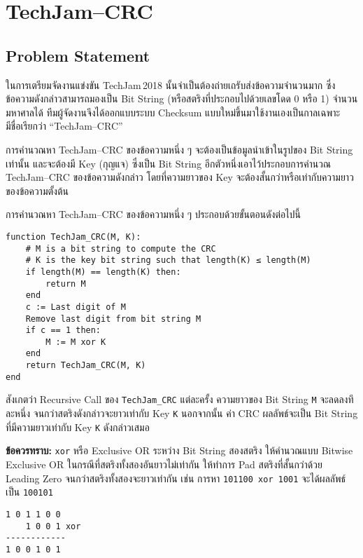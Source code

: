 \section{TechJam–CRC}

\subsection{Problem Statement}

ในการเตรียมจัดงานแข่งขัน TechJam{\,}2018 นั้นจำเป็นต้องถ่ายเถรับส่งข้อความจำนวนมาก ซึ่งข้อความดังกล่าวสามารถมองเป็น Bit String (หรือสตริงที่ประกอบไปด้วยเลขโดด 0 หรือ 1) จำนวนมหาศาลได้ \;
ทีมผู้จัดงานจึงได้ออกแบบระบบ Checksum แบบใหม่ขึ้นมาใช้งานเองเป็นกาลเฉพาะ มีชื่อเรียกว่า “{\hrsp}TechJam–CRC{\hrsp}”

การคำนวณหา TechJam–CRC ของข้อความหนึ่ง ๆ จะต้องเป็นข้อมูลนำเข้าในรูปของ Bit String เท่านั้น \;
และจะต้องมี Key (กุญแจ) ซึ่งเป็น Bit String อีกตัวหนึ่งเอาไว้ประกอบการคำนวณ TechJam–CRC ของข้อความดังกล่าว โดยที่ความยาวของ Key จะต้องสั้นกว่าหรือเท่ากับความยาวของข้อความตั้งต้น

การคำนวณหา TechJam–CRC ของข้อความหนึ่ง ๆ ประกอบด้วยขั้นตอนดังต่อไปนี้

\medskip
\begin{lstlisting}
function TechJam_CRC(M, K):
    # M is a bit string to compute the CRC
    # K is the key bit string such that length(K) ≤ length(M)
    if length(M) == length(K) then:
        return M
    end
    c := Last digit of M
    Remove last digit from bit string M
    if c == 1 then:
        M := M xor K 
    end
    return TechJam_CRC(M, K)
end
\end{lstlisting}

\medskip
สังเกตว่า Recursive Call ของ \lstinline{TechJam_CRC} แต่ละครั้ง ความยาวของ Bit String \lstinline{M} จะลดลงทึละหนึ่ง จนกว่าสตริงดังกล่าวจะยาวเท่ากับ Key \lstinline{K} \;
นอกจากนั้น ค่า CRC ผลลัพธ์จะเป็น Bit String ที่มีความยาวเท่ากับ Key \lstinline{K} ดังกล่าวเสมอ

\textbf{ข้อควรทราบ:} \lstinline{xor} หรือ Exclusive OR ระหว่าง Bit String สองสตริง ให้คำนวณแบบ Bitwise Exclusive OR \;
ในกรณีที่สตริงทั้งสองอันยาวไม่เท่ากัน ให้ทำการ Pad สตริงที่สั้นกว่าด้วย Leading Zero จนกว่าสตริงทั้งสองจะยาวเท่ากัน เช่น การหา \lstinline{101100 xor 1001} จะได้ผลลัพธ์เป็น \lstinline{100101}

\begin{center}
\begin{minipage}{0.35\linewidth}
\begin{lstlisting}[numbers=none]
1 0 1 1 0 0
    1 0 0 1 xor
------------
1 0 0 1 0 1
\end{lstlisting}
\end{minipage}
\end{center}


